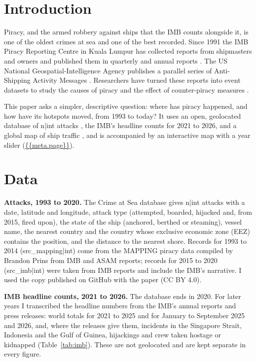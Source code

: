 \documentclass[11pt,a4paper]{article}
\begin{document}
\section{Introduction}
Piracy, and the armed robbery against ships that the IMB counts alongside it, is one of the oldest crimes at sea and one of the best recorded. Since 1991 the IMB Piracy Reporting Centre in Kuala Lumpur has collected reports from shipmasters and owners and published them in quarterly and annual reports \citep{imb}. The US National Geospatial-Intelligence Agency publishes a parallel series of Anti-Shipping Activity Messages \citep{asam}. Researchers have turned these reports into event datasets to study the causes of piracy \citep{coggins,daxecker} and the effect of counter-piracy measures \citep{shortland,bueger}.

This paper asks a simpler, descriptive question: where has piracy happened, and how have its hotspots moved, from 1993 to today? It uses an open, geolocated database of {{n|int}} attacks \citep{benden}, the IMB's headline counts for 2021 to 2026, and a global map of ship traffic \citep{wbships}, and is accompanied by an interactive map with a year slider (\url{{{meta.page}}}).

\section{Data}
\textbf{Attacks, 1993 to 2020.} The Crime at Sea database \citep{benden} gives {{n|int}} attacks with a date, latitude and longitude, attack type (attempted, boarded, hijacked and, from 2015, fired upon), the state of the ship (anchored, berthed or steaming), vessel name, the nearest country and the country whose exclusive economic zone (EEZ) contains the position, and the distance to the nearest shore. Records for 1993 to 2014 ({{src_mapping|int}}) come from the MAPPING piracy data compiled by Brandon Prins from IMB and ASAM reports; records for 2015 to 2020 ({{src_imb|int}}) were taken from IMB reports and include the IMB's narrative. I used the copy published on GitHub with the paper (CC BY 4.0).

\textbf{IMB headline counts, 2021 to 2026.} The database ends in 2020. For later years I transcribed the headline numbers from the IMB's annual reports and press releases: world totals for 2021 to 2025 and for January to September 2025 and 2026, and, where the releases give them, incidents in the Singapore Strait, Indonesia and the Gulf of Guinea, hijackings and crew taken hostage or kidnapped (Table~\ref{tab:imb}). These are not geolocated and are kept separate in every figure.
\end{document}
